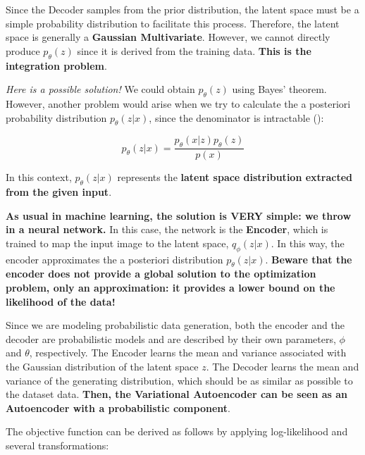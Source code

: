 Since the Decoder samples from the prior distribution, the latent space must be a simple probability distribution to facilitate this process. Therefore, the latent space is generally a \textbf{Gaussian Multivariate}. However, we cannot directly produce $p_{\theta}(z)$ since it is derived from the training data. \textbf{This is the integration problem}.

\textit{Here is a possible solution!} We could obtain $p_{\theta}(z)$ using Bayes' theorem. However, another problem would arise when we try to calculate the a posteriori probability distribution $p_{\theta}(z|x)$, since the denominator is intractable ():

$$p_{\theta}(z|x)= \frac{p_{\theta}(x|z)p_{\theta}(z)}{p(x)}$$

In this context, $p_{\theta}(z|x)$ represents the \textbf{latent space distribution extracted from the given input}.

\textbf{As usual in machine learning, the solution is VERY simple: we throw in a neural network.} In this case, the network is the \textbf{Encoder}, which is trained to map the input image to the latent space, $q_{\phi}(z|x)$. In this way, the encoder approximates the a posteriori distribution $p_{\theta}(z|x)$. \textbf{\textcolor{myred}{Beware that the encoder does not provide a global solution to the optimization problem, only an approximation: it provides a lower bound on the likelihood of the data!}}

Since we are modeling probabilistic data generation, both the encoder and the decoder are probabilistic models and are described by their own parameters, $\phi$ and $\theta$, respectively. The Encoder learns the mean and variance associated with the Gaussian distribution of the latent space $z$. The Decoder learns the mean and variance of the generating distribution, which should be as similar as possible to the dataset data.  \textbf{Then, the Variational Autoencoder can be seen as an Autoencoder with a probabilistic component}.

The objective function can be derived as follows by applying log-likelihood and several transformations:

